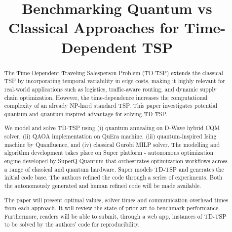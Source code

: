 \documentclass[conference]{IEEEtran}
\begin{document}
\title{Benchmarking Quantum vs Classical Approaches for Time-Dependent TSP}

\author{
\and
{}
\and
{}
}

\maketitle

\begin{abstract}
The Time-Dependent Traveling Salesperson Problem (TD-TSP) extends the classical TSP by incorporating temporal variability in edge costs, making it highly relevant for real-world applications such as logistics, traffic-aware routing, and dynamic supply chain optimization. However, the time-dependence increases the computational complexity of an already NP-hard standard TSP. This paper investigates potential quantum and quantum-inspired advantage for solving TD-TSP.

We model and solve TD-TSP using (i) quantum annealing on D-Wave hybrid CQM solver, (ii) QAOA implementation on QuEra machine, (iii) quantum-inspired Ising machine by Quanfluence, and (iv) classical Gurobi MILP solver. The modelling and algorithm development takes place on Super platform - autonomous optimization engine developed by SuperQ Quantum that orchestrates optimization workflows across a range of classical and quantum hardware. Super models TD-TSP and generates the initial code base. The authors refined the code through a series of experiments. Both the autonomously generated and human refined code will be made available.

The paper will present optimal values, solver times and communication overhead times from each approach. It will review the state of prior art to benchmark performance. Furthermore, readers will be able to submit, through a web app, instances of TD-TSP to be solved by the authors' code for reproducibility.
\end{abstract}
\end{document}
